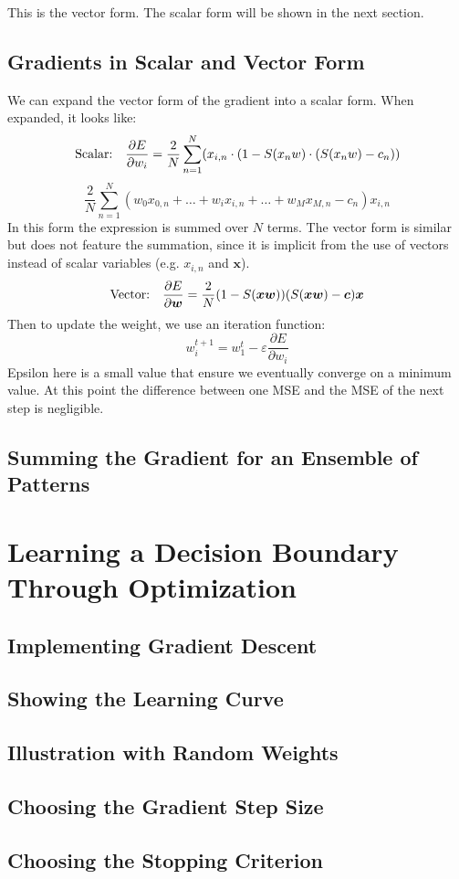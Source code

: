\documentclass[letterpaper]{article}
\begin{document}
This is the vector form. The scalar form will be shown in the next section.

\subsection{Gradients in Scalar and Vector Form}

We can expand the vector form of the gradient into a scalar form.
When expanded, it looks like:
\begin{equation*}
\text{Scalar:\quad} \frac{\partial E}{\partial w_i} = \frac{2}{N}\sum_{n=1}^N(x_{i,n}\cdot(1-S(x_n w)\cdot(S(x_n w)-c_n))
\end{equation*}
\begin{equation*}
\frac{2}{N}\sum_{n=1}^N(w_0x_{0,n}+\ldots+w_ix_{i,n}+\ldots+w_Mx_{M,n}-c_n)x_{i,n}
\end{equation*}
In this form the expression is summed over $N$ terms. The vector form is similar but
does not feature the summation, since it is implicit from the use of vectors
instead of scalar variables (e.g. $x_{i,n}$ and $\boldsymbol{x}$).
\begin{equation*}
\text{Vector:\quad} \frac{\partial E}{\partial\boldsymbol{w}} = \frac{2}{N}(1-S(\boldsymbol{x}\boldsymbol{w}))(S(\boldsymbol{x}\boldsymbol{w})-\boldsymbol{c})\boldsymbol{x}
\end{equation*}
Then to update the weight, we use an iteration function:
\begin{equation*}
w_i^{t+1}=w_1^t-\varepsilon\frac{\partial E}{\partial w_i}
\end{equation*}
Epsilon here is a small value that ensure we eventually converge on a minimum value.
At this point the difference between one MSE and the MSE of the next step is
negligible.

\subsection{Summing the Gradient for an Ensemble of Patterns}



\section{Learning a Decision Boundary Through Optimization}

\subsection{Implementing Gradient Descent}
\subsection{Showing the Learning Curve}
\subsection{Illustration with Random Weights}
\subsection{Choosing the Gradient Step Size}
\subsection{Choosing the Stopping Criterion}
\end{document}

